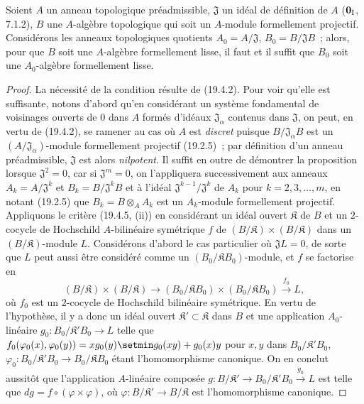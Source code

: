 \begin{proposition}[19.4.7]
\label{0.19.4.7-fr}
Soient $A$ un anneau topologique préadmissible, $\mathfrak J$ un idéal de
définition de $A$ \textup{($\mathbf 0_{\rm I}$, 7.1.2)}, $B$ une $A$-algèbre
topologique qui soit un $A$-module formellement projectif. Considérons les
anneaux topologiques quotients $A_0=A/\mathfrak J$,
$B_0=B/\mathfrak JB$~; alors, pour que $B$ soit
une $A$-algèbre formellement
lisse, il faut et il suffit que $B_0$ soit une $A_0$-algèbre formellement
lisse.
\end{proposition}

\begin{proof}
La nécessité de la condition résulte de (19.4.2). Pour voir qu'elle est
suffisante, notons d'abord qu'en considérant un système fondamental de
voisinages ouverts de $0$ dans $A$ formés d'idéaux
$\mathfrak J_\alpha$ contenus dans $\mathfrak J$, on peut, en vertu de
(19.4.2), se ramener au cas où $A$ est \emph{discret} puisque
$B/\mathfrak J_\alpha B$ est un
$(A/\mathfrak J_\alpha)$-module formellement projectif (19.2.5)~; par
définition d'un anneau préadmissible, $\mathfrak J$ est alors
\emph{nilpotent}. Il suffit en outre de démontrer la proposition lorsque
$\mathfrak J^2=0$, car si $\mathfrak J^m=0$, on l'appliquera successivement
aux anneaux $A_k=A/\mathfrak J^k$ et $B_k=B/\mathfrak J^kB$ et à l'idéal
$\mathfrak J^{k-1}/\mathfrak J^k$ de $A_k$ pour $k=2,3,\ldots,m$, en
notant (19.2.5) que $B_k=B\otimes_A A_k$ est un $A_k$-module formellement
projectif. Appliquons le critère (19.4.5, (ii)) en considérant un idéal ouvert
$\mathfrak K$ de $B$ et un $2$-cocycle de Hochschild $A$-bilinéaire
symétrique $f$ de $(B/\mathfrak K)\times(B/\mathfrak K)$ dans un
$(B/\mathfrak K)$-module $L$. Considérons d'abord le cas particulier où
$\mathfrak JL=0$, de sorte que $L$ peut aussi être considéré comme un
$(B_0/\mathfrak KB_0)$-module, et $f$ se factorise en
\[
  (B/\mathfrak K)\times(B/\mathfrak K)\to
  (B_0/\mathfrak KB_0)\times(B_0/\mathfrak KB_0)
  \xrightarrow{f_0}L,
\]
où $f_0$ est un $2$-cocycle de Hochschild bilinéaire symétrique. En vertu de
l'hypothèse, il y a donc un idéal ouvert
$\mathfrak K'\subset\mathfrak K$ dans $B$ et une application
$A_0$-linéaire $g_0:B_0/\mathfrak K'B_0\to L$ telle que
$f_0(\varphi_0(x),\varphi_0(y))
=xg_0(y)\setmin g_0(xy)+g_0(x)y$
pour $x,y$ dans $B_0/\mathfrak K'B_0$, $\varphi_0:B_0/\mathfrak K'B_0\to B_0/\mathfrak KB_0$ étant
l'homomorphisme canonique. On en conclut aussitôt que
l'application $A$-linéaire composée
$g:B/\mathfrak K'\to B_0/\mathfrak K'B_0\xrightarrow{g_0}L$ est telle
que $dg=f\circ(\varphi\times\varphi)$, où
$\varphi:B/\mathfrak K'\to B/\mathfrak K$ est l'homomorphisme
canonique.


\end{proof}
